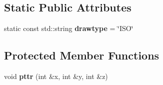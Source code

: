 \subsection*{Static Public Attributes}
\begin{DoxyCompactItemize}
\item 
\mbox{\label{classev_1_1isoDraw_af2ab4661d476d7fb42f3208165f42e0c}} 
static const std\+::string {\bfseries drawtype} = \char`\"{}I\+SO\char`\"{}
\end{DoxyCompactItemize}
\subsection*{Protected Member Functions}
\begin{DoxyCompactItemize}
\item 
\mbox{\label{classev_1_1isoDraw_a9e4a4d519846970a5d0f12af596a7188}} 
void {\bfseries pttr} (int \&x, int \&y, int \&z)
\end{DoxyCompactItemize}
